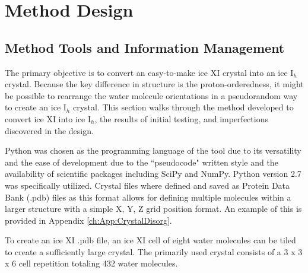\section{Method Design}


\subsection{Method Tools and Information Management}

The primary objective is to convert an easy-to-make ice XI crystal into an ice I$_{h}$ crystal.
Because the key difference in structure is the proton-orderedness, it might be possible to rearrange the water molecule orientations in a pseudorandom way to create an ice I$_{h}$ crystal.
This section walks through the method developed to convert ice XI into ice I$_{h}$, the results of initial testing, and imperfections discovered in the design.


Python was chosen as the programming language of the tool due to its versatility and the ease of development due to the ``pseudocode" written style and the availability of scientific packages including SciPy and NumPy. 
Python version 2.7 was specifically utilized.
Crystal files where defined and saved as Protein Data Bank (.pdb) files as this format allows for defining multiple molecules within a larger structure with a simple X, Y, Z grid position format. 
An example of this is provided in Appendix \ref{ch:App:CrystalDisorg}.


To create an ice XI .pdb file, an ice XI cell of eight water molecules can be tiled to create a sufficiently large crystal.
The primarily used crystal consists of a 3 x 3 x 6 cell repetition totaling 432 water molecules.


